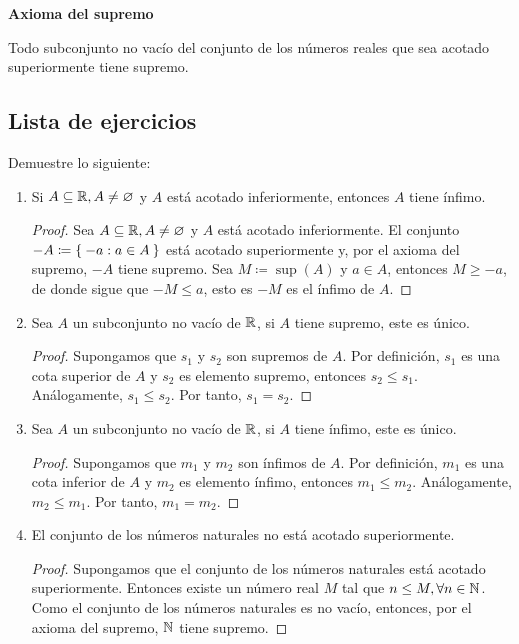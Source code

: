 \textbf{Axioma del supremo}

Todo subconjunto no vacío del conjunto de los números reales que sea acotado superiormente tiene supremo.

\clearpage\pagebreak

\subsection*{Lista de ejercicios}

Demuestre lo siguiente:

\begin{enumerate}[label=\alph*)]
  \item Si $A\subseteq \mathbb{R}, A\neq \varnothing$ y $A$ está acotado inferiormente, entonces $A$ tiene ínfimo.
  \begin{proof}\leavevmode
    Sea $A\subseteq \mathbb{R}, A\neq \varnothing$ y $A$ está acotado inferiormente. El conjunto $-A \coloneqq \Set{-a: a\in A}$ está acotado superiormente y, por el axioma del supremo, $-A$ tiene supremo. Sea $M\coloneqq \sup{(A)}$ y $a\in A$, entonces $M\geq -a$, de donde sigue que $-M\leq a$, esto es $-M$ es el ínfimo de $A$.
  \end{proof}
  
  \item Sea $A$ un subconjunto no vacío de $\mathbb{R}$, si $A$ tiene supremo, este es único.
 
  \begin{proof} 
   Supongamos que $s_1$ y $s_2$ son supremos de $A$. Por definición, $s_1$ es una cota superior de $A$ y $s_2$ es elemento supremo, entonces $s_2\leq s_1$. Análogamente, $s_1\leq s_2$. Por tanto, $s_1=s_2$.
  \end{proof}
 
  \item Sea $A$ un subconjunto no vacío de $\mathbb{R}$, si $A$ tiene ínfimo, este es único.
  
  \begin{proof} 
   Supongamos que $m_1$ y $m_2$ son ínfimos de $A$. Por definición, $m_1$ es una cota inferior de $A$ y $m_2$ es elemento ínfimo, entonces $m_1\leq m_2$. Análogamente, $m_2\leq m_1$. Por tanto, $m_1=m_2$. 
  \end{proof}
  
  \item El conjunto de los números naturales no está acotado superiormente.
  \begin{proof}\leavevmode
    Supongamos que el conjunto de los números naturales está acotado superiormente. Entonces existe un número real $M$ tal que $n\leq M, \forall n\in \mathbb{N}$. Como el conjunto de los números naturales es no vacío, entonces, por el axioma del supremo, $\mathbb{N}$ tiene supremo.


\end{proof}
\end{enumerate}
